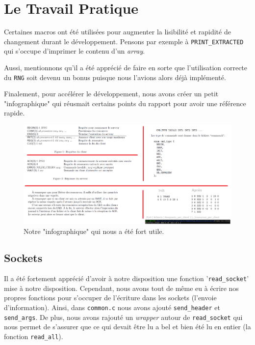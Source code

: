 \documentclass[11pt]{article}
\begin{document}
\section{Le Travail Pratique}

Certaines macros ont été utilisées pour augmenter la lisibilité et rapidité de changement durant le développement. Pensons par exemple à \texttt{PRINT\_EXTRACTED} qui s'occupe d'imprimer le contenu d'un \textit{array}.

Aussi, mentionnons qu'il a été apprécié de faire en sorte que l'utilisation correcte du \texttt{RNG} soit devenu un bonus puisque nous l'avions alors déjà implémenté.

Finalement, pour accélérer le développement, nous avons créer un petit "infographique" qui réusmait certains points du rapport pour avoir une référence rapide.

\begin{figure}
    \includegraphics[width=\linewidth]{infographic.png}
    \caption{Notre "infographique" qui nous a été fort utile.}
    \label{fig:infog}
\end{figure}

\subsection{Sockets}

Il a été fortement apprécié d'avoir à notre disposition une fonction '\texttt{read\_socket}' mise à notre disposition. Cependant, nous avons tout de même eu à écrire nos propres fonctions pour s'occuper de l'écriture dans les sockets (l'envoie d'information). Ainsi, dans \texttt{common.c} nous avons ajouté \texttt{send\_header} et \texttt{send\_args}. De plus, nous avons rajouté un \textit{wrapper} autour de \texttt{read\_socket} qui nous permet de s'assurer que ce qui devait être lu a bel et bien été lu en entier (la fonction \texttt{read\_all}).
\end{document}
